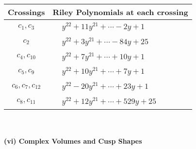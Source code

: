 \documentclass[1p]{elsarticle_modified}
\theoremstyle{definition}
\begin{document}
\begin{tabular}{m{50pt}|m{274pt}}
Crossings & \hspace{64pt}Riley Polynomials at each crossing \\
\hline $$\begin{aligned}c_{1},c_{3}\end{aligned}$$&$\begin{aligned}
&y^{22}+11 y^{21}+\cdots-2 y+1
\end{aligned}$\\
\hline $$\begin{aligned}c_{2}\end{aligned}$$&$\begin{aligned}
&y^{22}+3 y^{21}+\cdots-84 y+25
\end{aligned}$\\
\hline $$\begin{aligned}c_{4},c_{10}\end{aligned}$$&$\begin{aligned}
&y^{22}+7 y^{21}+\cdots+10 y+1
\end{aligned}$\\
\hline $$\begin{aligned}c_{5},c_{9}\end{aligned}$$&$\begin{aligned}
&y^{22}+10 y^{21}+\cdots+7 y+1
\end{aligned}$\\
\hline $$\begin{aligned}c_{6},c_{7},c_{12}\end{aligned}$$&$\begin{aligned}
&y^{22}-20 y^{21}+\cdots+23 y+1
\end{aligned}$\\
\hline $$\begin{aligned}c_{8},c_{11}\end{aligned}$$&$\begin{aligned}
&y^{22}+12 y^{21}+\cdots+529 y+25
\end{aligned}$\\
\hline
\end{tabular}\\~\\
\newpage\flushleft \textbf{(vi) Complex Volumes and Cusp Shapes}
\end{document}
